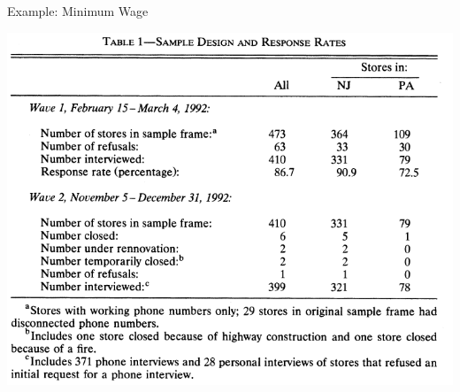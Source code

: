 \begin{frame}{Example: Minimum Wage}

  \includegraphics[height=.8\textheight]{./resources/CKSumStats}
\end{frame}
  
